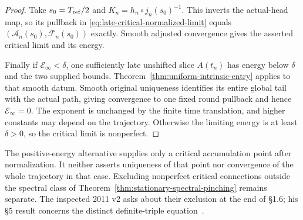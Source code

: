 \documentclass[11pt]{article}
\numberwithin{equation}{section}
\theoremstyle{definition}
\theoremstyle{remark}
\begin{document}
\begin{proof}
Take $s_0=T_{\rm ref}/2$ and
$K_n=h_n\circ j_n(s_0)^{-1}$. This inverts the actual-head
map, so its pullback in
\eqref{eq:late-critical-normalized-limit} equals
$(\mathcal A_n(s_0),\mathcal F_n(s_0))$ exactly.
Smooth adjusted convergence gives the asserted critical
limit and its energy.

Finally if $\mathscr E_\infty<\delta$, one sufficiently
late unshifted slice $A(t_n)$ has energy below $\delta$
and the two supplied bounds. Theorem~\ref{thm:uniform-intrinsic-entry}
applies to that smooth datum. Smooth original uniqueness
identifies its entire global tail with the actual path,
giving convergence to one fixed round pullback and hence
$\mathscr E_\infty=0$. The exponent is unchanged by the
finite time translation, and higher constants may depend
on the trajectory. Otherwise the limiting energy is at
least $\delta>0$, so the critical limit is nonperfect.
\end{proof}

The positive-energy alternative supplies only a critical
accumulation point after normalization. It neither asserts
uniqueness of that point nor convergence of the whole
trajectory in that case. Excluding nonperfect critical
connections outside the spectral class of
Theorem~\ref{thm:stationary-spectral-pinching} remains separate. The inspected 2011 v2 asks
about their exclusion at the end of \S1.6; his \S5 result concerns
the distinct definite-triple equation~\cite[\S1.6 and \S5]{Fine2011}.
\end{document}

